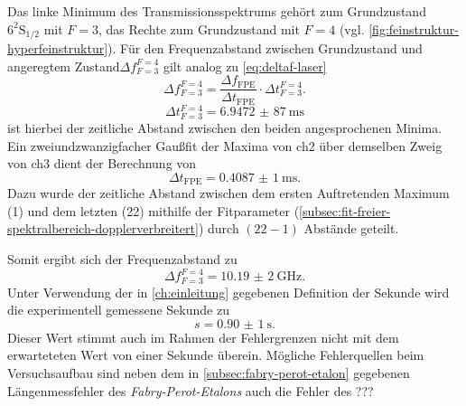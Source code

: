 \documentclass[../bericht.tex]{subfiles}
\begin{document}
        Das linke Minimum des Transmissionsspektrums geh\"ort zum Grundzustand $\mathrm{6^2S_{1/2}}$ mit $F=3$, das Rechte zum Grundzustand mit $F=4$ (vgl. \cref{fig:feinstruktur-hyperfeinstruktur}). F\"ur den Frequenzabstand zwischen Grundzustand und angeregtem Zustand$\Delta f_{F=3}^{F=4}$ gilt analog zu \cref{eq:deltaf-laser}
        \begin{equation*}
          \Delta f_{F=3}^{F=4} = \frac{\Delta f_\mathrm{FPE}}{\Delta t_\mathrm{FPE}}\cdot \Delta t_{F=3}^{F=4}.
        \end{equation*}
        \begin{equation*}
          \Delta t_{F=3}^{F=4}= \SI{6,9472(87)}{\milli\second}
        \end{equation*}
        ist hierbei der zeitliche Abstand zwischen den beiden angesprochenen Minima. Ein zweiundzwanzigfacher Gau\ss{}fit der Maxima von ch2 \"uber demselben Zweig von ch3 dient der Berechnung von
        \begin{equation*}
          \Delta t_\mathrm{FPE}=\SI{0,4087(1)}{\milli\second}.
        \end{equation*}
        Dazu wurde der zeitliche Abstand zwischen dem ersten Auftretenden Maximum (1) und dem letzten (22) mithilfe der Fitparameter (\cref{subsec:fit-freier-spektralbereich-dopplerverbreitert}) durch $(22-1)$ Abst\"ande geteilt.

        Somit ergibt sich der Frequenzabstand zu
        \begin{equation*}
          \Delta f_{F=3}^{F=4} = \SI{10,19(2)}{\giga\hertz}.
        \end{equation*}
        Unter Verwendung der in \cref{ch:einleitung} gegebenen Definition der Sekunde wird die experimentell gemessene Sekunde zu
        \begin{equation*}
          s=\SI{0,90(1)}{\second}.
        \end{equation*}
        Dieser Wert stimmt auch im Rahmen der Fehlergrenzen nicht mit dem erwarteteten Wert von einer Sekunde \"uberein. M\"ogliche Fehlerquellen beim Versuchsaufbau sind neben dem in \cref{subsec:fabry-perot-etalon} gegebenen L\"angenmessfehler des \textit{Fabry-Perot-Etalons} auch die Fehler des ???
\end{document}
